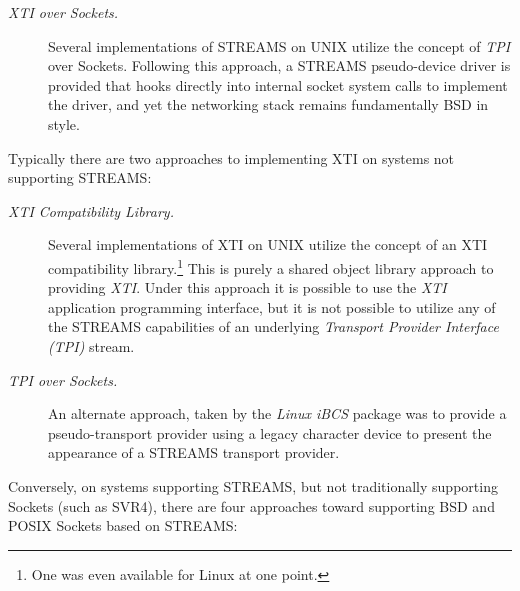 \documentclass[letterpaper,final,notitlepage,twocolumn,10pt,twoside]{article}
\begin{document}
\begin{description}

\item[{\it XTI over Sockets.}]

Several implementations of STREAMS on UNIX utilize the concept of \textsl{TPI} over Sockets.
Following this approach, a STREAMS pseudo-device driver is provided that hooks directly into
internal socket system calls to implement the driver, and yet the networking stack remains
fundamentally BSD in style.

\end{description}

Typically there are two approaches to implementing XTI on systems not supporting STREAMS:

\begin{description}

\item[{\it XTI Compatibility Library.}]

Several implementations of XTI on UNIX utilize the concept of an XTI compatibility
library.\footnote{One was even available for Linux at one point.}  This is purely a shared object
library approach to providing \textsl{XTI}.  Under this approach it is possible to use the
\textsl{XTI} application programming interface, but it is not possible to utilize any of the STREAMS
capabilities of an underlying \textit{Transport Provider Interface (TPI)} stream.

\item[{\it TPI over Sockets.}]

An alternate approach, taken by the \textsl{Linux iBCS} package was to provide a pseudo-transport
provider using a legacy character device to present the appearance of a STREAMS transport provider.

\end{description}

Conversely, on systems supporting STREAMS, but not traditionally supporting Sockets (such as SVR4),
there are four approaches toward supporting BSD and POSIX Sockets based on STREAMS:
\end{document}
